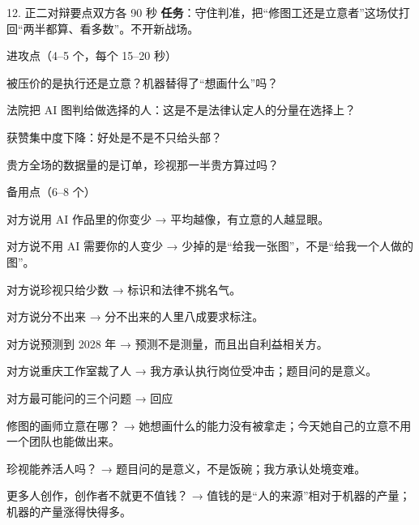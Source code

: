 \documentclass[script,pro]{debate}
\begin{document}
\begin{stage}{12. 正二对辩要点}{双方各 90 秒}
\textbf{任务}：守住判准，把“修图工还是立意者”这场仗打回“两半都算、看多数”。不开新战场。
\begin{points}{进攻点（4–5 个，每个 15–20 秒）}
\item 被压价的是执行还是立意？机器替得了“想画什么”吗？
\item 法院把 AI 图判给做选择的人：这是不是法律认定人的分量在选择上？
\item 获赞集中度下降：好处是不是不只给头部？
\item 贵方全场的数据量的是订单，珍视那一半贵方算过吗？
\end{points}
\begin{points}{备用点（6–8 个）}
\item 对方说用 AI 作品里的你变少 → 平均越像，有立意的人越显眼。
\item 对方说不用 AI 需要你的人变少 → 少掉的是“给我一张图”，不是“给我一个人做的图”。
\item 对方说珍视只给少数 → 标识和法律不挑名气。
\item 对方说分不出来 → 分不出来的人里八成要求标注。
\item 对方说预测到 2028 年 → 预测不是测量，而且出自利益相关方。
\item 对方说重庆工作室裁了人 → 我方承认执行岗位受冲击；题目问的是意义。
\end{points}
\begin{points}{对方最可能问的三个问题 → 回应}
\item 修图的画师立意在哪？ → 她想画什么的能力没有被拿走；今天她自己的立意不用一个团队也能做出来。
\item 珍视能养活人吗？ → 题目问的是意义，不是饭碗；我方承认处境变难。
\item 更多人创作，创作者不就更不值钱？ → 值钱的是“人的来源”相对于机器的产量；机器的产量涨得快得多。
\end{points}
\end{stage}
\end{document}

